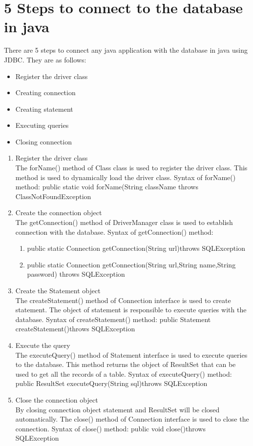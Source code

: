 \section{5 Steps to connect to the database in java}
There are 5 steps to connect any java application with the database in java using JDBC. They are as follows: 
\begin{itemize}
\item{Register the driver class }
\item{Creating connection} 
\item{Creating statement} 
\item{Executing queries} 
\item{Closing connection}
\end{itemize}
\begin{enumerate}
	\item{Register the driver class\\
	The forName() method of Class class is used to register the driver class. This method is used to dynamically load the driver class. 
	Syntax of forName() method: 	
		public static void forName(String className throws ClassNotFoundException  }
	\item{Create the connection object\\
	The getConnection() method of DriverManager class is used to establish connection with the database. 
	Syntax of getConnection() method:}
	\begin{enumerate}
		\item{public static Connection getConnection(String url)throws SQLException }
		\item{public static Connection getConnection(String url,String name,String password) throws SQLException}
	\end{enumerate}
	\item{Create the Statement object\\
	The createStatement() method of Connection interface is used to create statement. The object of statement is responsible to execute queries with the database. 
	Syntax of createStatement() method:
 		public Statement createStatement()throws SQLException}
  	\item{Execute the query\\
	The executeQuery() method of Statement interface is used to execute queries to the database. This method returns the object of ResultSet that can be used to get all the records of 	a table. 
	Syntax of executeQuery() method:
    	public ResultSet executeQuery(String sql)throws SQLException  }
	\item{Close the connection object\\
	By closing connection object statement and ResultSet will be closed automatically. The close() method of Connection interface is used to close the connection. 
	Syntax of close() method:
      		public void close()throws SQLException }
\end{enumerate}

